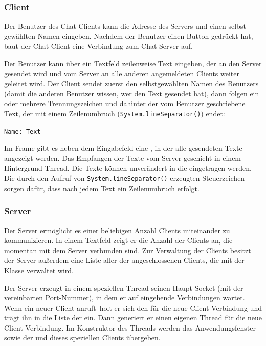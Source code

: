 \subsubsection{Client}

Der Benutzer des Chat-Clients kann die Adresse des Servers und einen selbst
gewählten Namen eingeben. Nachdem der Benutzer einen Button gedrückt hat, baut
der Chat-Client eine Verbindung zum Chat-Server auf.

Der Benutzer kann über ein Textfeld zeilenweise Text eingeben, der an den
Server gesendet wird und vom Server an alle anderen angemeldeten Clients weiter
geleitet wird. Der Client sendet zuerst den selbstgewählten Namen des Benutzers
(damit die anderen Benutzer wissen, wer den Text gesendet hat), dann folgen ein
oder mehrere Trennungszeichen und dahinter der vom Benutzer geschriebene Text,
der mit einem Zeilenumbruch (\lstinline|System.lineSeparator()|) endet:

\lstinline|Name: Text|

Im Frame gibt es neben dem Eingabefeld eine , in der alle
gesendeten Texte angezeigt werden. Das Empfangen der Texte vom Server geschieht
in einem Hintergrund-Thread. Die Texte können unverändert in die
 eingetragen werden. Die durch den Aufruf von
\lstinline|System.lineSeparator()| erzeugten Steuerzeichen sorgen dafür, dass
nach jedem Text ein Zeilenumbruch erfolgt.

\subsubsection{Server}

Der Server ermöglicht es einer beliebigen Anzahl Clients miteinander zu
kommunizieren. In einem Textfeld zeigt er die Anzahl der Clients an, die
momentan mit dem Server verbunden sind. Zur Verwaltung der Clients besitzt der
Server außerdem eine Liste aller  der
angeschlossenen Clients, die mit der Klasse  verwaltet wird.

Der Server erzeugt in einem speziellen Thread seinen Haupt-Socket (mit der
vereinbarten Port-Nummer), in dem er auf eingehende Verbindungen wartet. Wenn
ein neuer Client \glqq anruft\grqq\ holt er sich den
 für die neue Client-Verbindung und trägt ihn in
die Liste der  ein. Dann generiert er einen eigenen
Thread für die neue Client-Verbindung. Im Konstruktor des Threads werden das
Anwendungsfenster sowie der  und
 dieses speziellen Clients übergeben.


